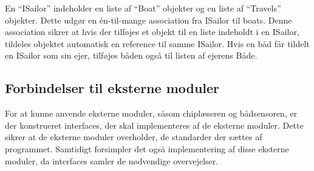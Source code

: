 En \enquote{ISailor} indeholder en liste af \enquote{Boat} objekter og en liste af \enquote{Travels} objekter. Dette udgør en én-til-mange association fra ISailor til boats. Denne association sikrer at hvis der tilføjes et objekt til en liste indeholdt i en ISailor, tildeles objektet automatisk en reference til samme ISailor. Hvis en båd får tildelt en ISailor som sin ejer, tilføjes båden også til listen af ejerens Både. 

\subsection{Forbindelser til eksterne moduler}

For at kunne anvende eksterne moduler, såsom chiplæseren og bådsensoren, er der konstrueret interfaces, der skal implementeres af de eksterne moduler. Dette sikrer at de eksterne moduler overholder, de standarder der sættes af programmet. Samtidigt forsimpler det også implementering af disse eksterne moduler, da interfaces samler de nødvendige overvejelser.
